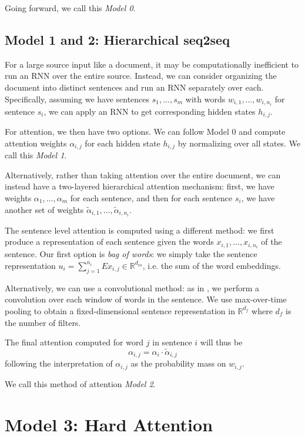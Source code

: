 \documentclass[11pt]{report}
\begin{document}
Going forward, we call this \emph{Model 0}.

\subsection{Model 1 and 2: Hierarchical seq2seq}

For a large source input like a document, it may be computationally inefficient to run an RNN over the entire source. Instead, we can consider organizing the document into distinct sentences and run an RNN separately over each. Specifically, assuming we have sentences $s_1, \ldots, s_m$ with words $w_{i,1}, \ldots, w_{i,n_i}$ for sentence $s_i$, we can apply an RNN to get corresponding hidden states $h_{i,j}$.

For attention, we then have two options. We can follow Model 0 and compute attention weights $\alpha_{i,j}$ for each hidden state $h_{i,j}$ by normalizing over all states. We call this \emph{Model 1}.

Alternatively, rather than taking attention over the entire document, we can instead have a two-layered hierarchical attention mechanism: first, we have weights $\alpha_1, \ldots, \alpha_m$ for each sentence, and then for each sentence $s_i$, we have another set of weights $\widetilde{\alpha}_{i,1}, \ldots, \widetilde{\alpha}_{i,n_i}$.

The sentence level attention is computed using a different method: we first produce a representation of each sentence given the words $x_{i,1}, \ldots, x_{i, n_i}$ of the sentence. Our first option is \emph{bag of words}: we simply take the sentence representation $u_i = \sum_{j=1}^{n_i} Ex_{i,j} \in \mathbb{R}^{d_{in}}$, i.e. the sum of the word embeddings.

Alternatively, we can use a convolutional method: as in \cite{kim2014convolutional}, we perform a convolution over each window of words in the sentence. We use max-over-time pooling to obtain a fixed-dimensional sentence representation in $\mathbb{R}^{d_f}$ where $d_f$ is the number of filters.


The final attention computed for word $j$ in sentence $i$ will thus be
$$\alpha_{i,j} = \alpha_i \cdot \widetilde{\alpha}_{i,j}$$
following the interpretation of $\alpha_{i,j}$ as the probability mass on $w_{i,j}$.

We call this method of attention \emph{Model 2}.

\section{Model 3: Hard Attention}
\end{document}
